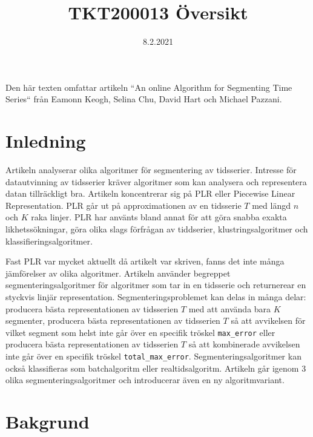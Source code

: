 \documentclass{article}
\title{TKT200013 Översikt}
\date{8.2.2021}
\begin{document}
\maketitle

Den här texten omfattar artikeln ``An online Algorithm for Segmenting Time Series`` från Eamonn Keogh, Selina Chu, David Hart och Michael Pazzani.

\section{Inledning}

Artikeln analyserar olika algoritmer för segmentering av tidsserier. Intresse för datautvinning av tidsserier kräver algoritmer som kan analysera och representera datan tillräckligt bra. Artikeln koncentrerar sig på PLR eller Piecewise Linear Representation. PLR går ut på approximationen av en tidsserie $T$ med längd $n$ och $K$ raka linjer. PLR har använts bland annat för att göra snabba exakta likhetssökningar, göra olika slags förfrågan av tiddserier, klustringsalgoritmer och klassifieringsalgoritmer.
\bigskip

Fast PLR var mycket aktuellt då artikelt var skriven, fanns det inte många jämförelser av olika algoritmer. Artikeln använder begreppet segmenteringsalgoritmer för algoritmer som tar in en tidsserie och returnerear en styckvis linjär representation. Segmenteringsproblemet kan delas in många delar: producera bästa representationen av tidsserien $T$ med att använda bara $K$ segmenter, producera bästa representationen av tidsserien $T$ så att avvikelsen för vilket segment som helst inte går över en specifik tröskel \texttt{max_error} eller producera bästa representationen av tidsserien $T$ så att kombinerade avvikelsen inte går över en specifik tröskel \texttt{total_max_error}. Segmenteringsalgoritmer kan också klassifieras som batchalgoritm eller realtidsalgoritm. Artikeln går igenom 3 olika segmenteringsalgoritmer och introducerar även en ny algoritmvariant.
\bigskip

\section{Bakgrund}
\end{document}
